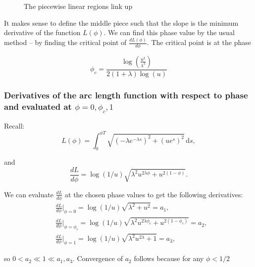 \begin{figure}[h!]
 \caption{The piecewise linear regions link up}
\end{figure}

It makes sense to define the middle piece such that the slope is the minimum derivative of the function $L(\phi)$.  We can find this phase value by the usual method -- by finding the critical point of $\frac{dL(\phi)}{d\phi}$.  The critical point is at the phase

\begin{equation}
 \phi_c = \frac{\log(\frac{u^2}{\lambda^3})}{2(1+\lambda)\log(u)}
\end{equation}






\subsubsection{Derivatives of the arc length function with respect to phase and evaluated at $\phi = 0,  \phi_c, 1$}

Recall:
\begin{equation}
 L(\phi) = \int_0^{\phi T} \! \sqrt{(-\lambda e^{-\lambda s})^2 + (u e^s)^2} \, \mathrm{d}s,
\end{equation}

and 
\begin{equation}
 \frac{d L}{d \phi} = \log(1/u) \sqrt{\lambda^2  u^{2\lambda \phi} + u^{2(1-\phi)}}.
\end{equation}


We can evaluate $\frac{dL}{d\phi}$ at the chosen phase values to get the following derivatives:
\begin{align}
&\frac{d L}{d \phi}|_{\phi=0} = \log(1/u)\sqrt{\lambda^2+u^2}=a_1,\\
&\frac{d L}{d \phi}|_{\phi=\phi_c} = \log(1/u) \sqrt{\lambda^2  u^{2\lambda \phi_c} + u^{2(1-\phi_c)}} = a_2,\\ %
&\frac{d L}{d \phi}|_{\phi=1} = \log(1/u)\sqrt{\lambda^2 u^{2\lambda}+1}=a_3,
\end{align}

so $0 < a_2 \ll 1 \ll a_1,a_3$.  Convergence of $a_2$ follows because for any $\phi < 1/2$

